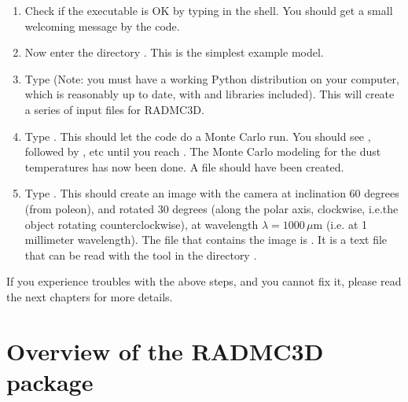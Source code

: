 \documentclass[letterpaper,10pt,english]{sphinxmanual}
\begin{document}
\begin{enumerate}
\item {} 
Check if the executable is OK by typing  in the
shell. You should get a small welcoming message by the code.

\item {} 
Now enter the directory . This is
the simplest example model.

\item {} 
Type  (Note: you must have a
working Python distribution on your computer, which is reasonably
up to date, with  and  libraries
included). This will create a series of input files for RADMC\sphinxhyphen{}3D.

\item {} 
Type . This should let the code do a Monte
Carlo run. You should see , followed by
, etc until you reach . The Monte Carlo modeling for the dust temperatures has now
been done. A file  should have
been created.

\item {} 
Type . This should
create an image with the camera at inclination 60 degrees (from pole\sphinxhyphen{}on), and
rotated 30 degrees (along the polar axis, clockwise, i.e.the object rotating
counter\sphinxhyphen{}clockwise), at wavelength \(\lambda=1000\,\mu\mathrm{m}\) (i.e. at 1
millimeter wavelength). The file that contains the image is .
It is a text file that can be read with the  tool in the
directory .

\end{enumerate}

If you experience troubles with the above steps, and you cannot fix it,
please read the next chapters for more details.


\chapter{Overview of the RADMC\sphinxhyphen{}3D package}
\label{\detokenize{overview:overview-of-the-radmc-3d-package}}\label{\detokenize{overview::doc}}
\end{document}

